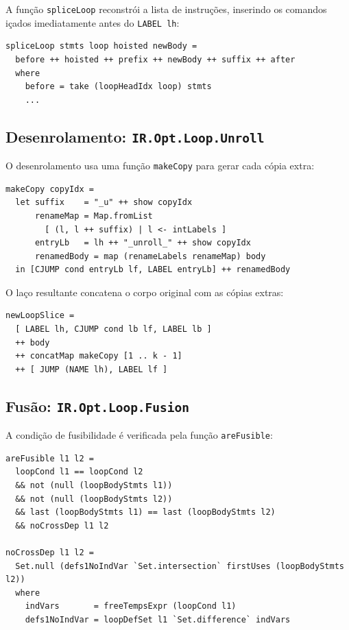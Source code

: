A função \texttt{spliceLoop} reconstrói a lista de instruções, inserindo os
comandos içados imediatamente antes do \texttt{LABEL lh}:

\begin{verbatim}
spliceLoop stmts loop hoisted newBody =
  before ++ hoisted ++ prefix ++ newBody ++ suffix ++ after
  where
    before = take (loopHeadIdx loop) stmts
    ...
\end{verbatim}

\subsection{Desenrolamento: \texttt{IR.Opt.Loop.Unroll}}\label{sec:impl-unroll}

O desenrolamento usa uma função \texttt{makeCopy} para gerar cada cópia extra:

\begin{verbatim}
makeCopy copyIdx =
  let suffix    = "_u" ++ show copyIdx
      renameMap = Map.fromList
        [ (l, l ++ suffix) | l <- intLabels ]
      entryLb   = lh ++ "_unroll_" ++ show copyIdx
      renamedBody = map (renameLabels renameMap) body
  in [CJUMP cond entryLb lf, LABEL entryLb] ++ renamedBody
\end{verbatim}

O laço resultante concatena o corpo original com as cópias extras:

\begin{verbatim}
newLoopSlice =
  [ LABEL lh, CJUMP cond lb lf, LABEL lb ]
  ++ body
  ++ concatMap makeCopy [1 .. k - 1]
  ++ [ JUMP (NAME lh), LABEL lf ]
\end{verbatim}

\subsection{Fusão: \texttt{IR.Opt.Loop.Fusion}}\label{sec:impl-fusion}

A condição de fusibilidade é verificada pela função \texttt{areFusible}:

\begin{verbatim}
areFusible l1 l2 =
  loopCond l1 == loopCond l2
  && not (null (loopBodyStmts l1))
  && not (null (loopBodyStmts l2))
  && last (loopBodyStmts l1) == last (loopBodyStmts l2)
  && noCrossDep l1 l2

noCrossDep l1 l2 =
  Set.null (defs1NoIndVar `Set.intersection` firstUses (loopBodyStmts l2))
  where
    indVars       = freeTempsExpr (loopCond l1)
    defs1NoIndVar = loopDefSet l1 `Set.difference` indVars
\end{verbatim}

